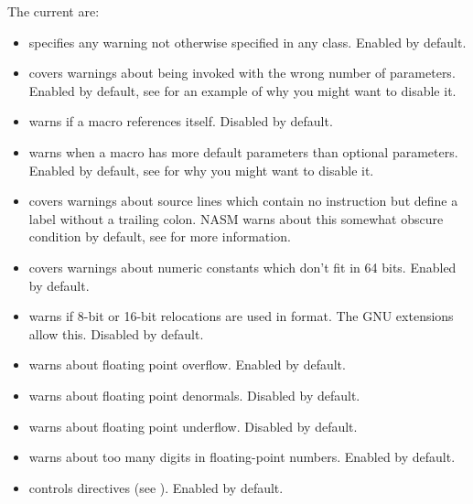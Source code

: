 The current  are:
\begin{itemize}

	\item {} specifies any warning not otherwise
	specified in any class. Enabled by default.

	\item {} covers warnings about
	 being invoked with the wrong number
	of parameters. Enabled by default, see 
	for an example of why you might want to disable it.

	\item {} warns if a macro references itself.
	Disabled by default.

	\item {} warns when a macro has more
	default parameters than optional parameters. Enabled by default,
	see  for why you might want to disable it.

	\item {} covers warnings about source lines
	which contain no instruction but define a label without a trailing colon.
	NASM warns about this somewhat obscure condition by default,
	see  for more information.

	\item {} covers warnings about numeric
	constants which don't fit in 64 bits. Enabled by default.

	\item {} warns if 8-bit or 16-bit
	relocations are used in  format. The GNU extensions
	allow this. Disabled by default.

	\item {} warns about floating point overflow.
	Enabled by default.

	\item {} warns about floating point denormals.
	Disabled by default.

	\item {} warns about floating point underflow.
	Disabled by default.

	\item {} warns about too many digits in
	floating-point numbers. Enabled by default.

	\item {} controls  directives (see
	). Enabled by default.


\end{itemize}
